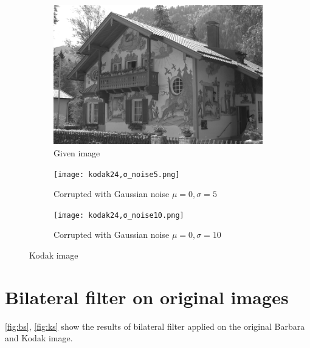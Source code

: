 \documentclass[a4paper, landscape]{article}
\begin{document}
\begin{figure}
    \centering
    \begin{subfigure}{0.33\linewidth}
        \centering
        \includegraphics[width=\linewidth]{kodak24.png}
        \caption{Given image}
    \end{subfigure}
    \begin{subfigure}{0.33\linewidth}
        \centering
        \texttt{[image: kodak24,σ\_noise5.png]}
        \caption{Corrupted with Gaussian noise $\mu=0, \sigma=5$}
    \end{subfigure}
    \begin{subfigure}{0.33\linewidth}
        \centering
        \texttt{[image: kodak24,σ\_noise10.png]}
        \caption{Corrupted with Gaussian noise $\mu=0, \sigma=10$}
    \end{subfigure}
    \caption{Kodak image}
    \label{fig:ko}
\end{figure}
\section{Bilateral filter on original images}{\label{sec:bfo}}
\ref{fig:bs}, \ref{fig:ks} show the results of bilateral filter applied on the original Barbara and Kodak image.
\end{document}
